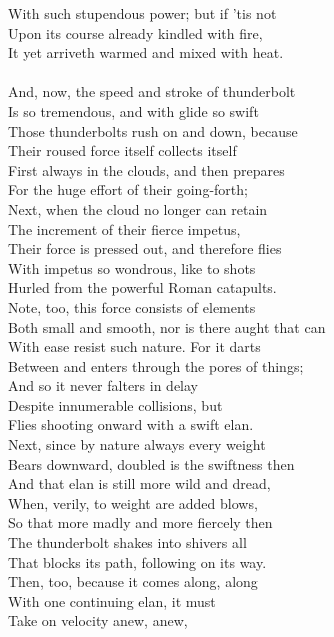 With such stupendous power; but if 'tis not\\
Upon its course already kindled with fire,\\
It yet arriveth warmed and mixed with heat.\\
\\
And, now, the speed and stroke of thunderbolt\\
Is so tremendous, and with glide so swift\\
Those thunderbolts rush on and down, because\\
Their roused force itself collects itself\\
First always in the clouds, and then prepares\\
For the huge effort of their going-forth;\\
Next, when the cloud no longer can retain\\
The increment of their fierce impetus,\\
Their force is pressed out, and therefore flies\\
With impetus so wondrous, like to shots\\
Hurled from the powerful Roman catapults.\\
Note, too, this force consists of elements\\
Both small and smooth, nor is there aught that can\\
With ease resist such nature. For it darts\\
Between and enters through the pores of things;\\
And so it never falters in delay\\
Despite innumerable collisions, but\\
Flies shooting onward with a swift elan.\\
Next, since by nature always every weight\\
Bears downward, doubled is the swiftness then\\
And that elan is still more wild and dread,\\
When, verily, to weight are added blows,\\
So that more madly and more fiercely then\\
The thunderbolt shakes into shivers all\\
That blocks its path, following on its way.\\
Then, too, because it comes along, along\\
With one continuing elan, it must\\
Take on velocity anew, anew,\\
